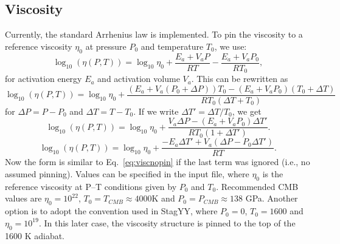 \subsection{Viscosity}
Currently, the standard Arrhenius law is implemented.  To pin the viscosity to a reference viscosity $\eta_0$ at pressure $P_0$ and temperature $T_0$, we use:
\begin{equation}
\log_{10} ( \eta (P,T)) = \log_{10} \eta_0 + \frac{E_a + V_aP}{RT} - \frac{E_a + V_a P_0}{R T_0},
\label{eq:viscnopin}
\end{equation}
for activation energy $E_a$ and activation volume $V_a$.  This can be rewritten as
\begin{equation*}
\log_{10} ( \eta (P,T)) = \log_{10} \eta_0 + \frac{(E_a + V_a(P_0 + \Delta P))T_0 - (E_a + V_aP_0)(T_0 + \Delta T)}{R T_0 (\Delta T + T_0)}
\end{equation*}
for $\Delta P = P - P_0$ and $\Delta T = T - T_0$. If we write $\Delta T' = \Delta T/T_0$, we get
\begin{equation}
\log_{10} ( \eta (P,T)) = \log_{10} \eta_0 + \frac{V_a \Delta P - (E_a + V_a P_0)\Delta T'}{R T_0 (1 + \Delta T')}.
\end{equation}
\begin{equation}
\log_{10} ( \eta (P,T)) = \log_{10} \eta_0 + \frac{-E_a \Delta T' + V_a (\Delta P - P_0 \Delta T')}{R T}.
\end{equation}
Now the form is similar to Eq.~\ref{eq:viscnopin} if the last term was ignored (i.e., no assumed pinning).
Values can be specified in the input file, where $\eta_0$ is the reference viscosity at P--T conditions given by $P_0$ and $T_0$.  Recommended CMB values are $\eta_0 = 10^{22}$, $T_0 = T_{CMB} \approx 4000$K and $P_0 = P_{CMB} \approx 138$ GPa.  Another option is to adopt the convention used in StagYY, where $P_0 = 0$, $T_0 = 1600$ and $\eta_0 = 10^{19}$.  In this later case, the viscosity structure is pinned to the top of the 1600 K adiabat.

